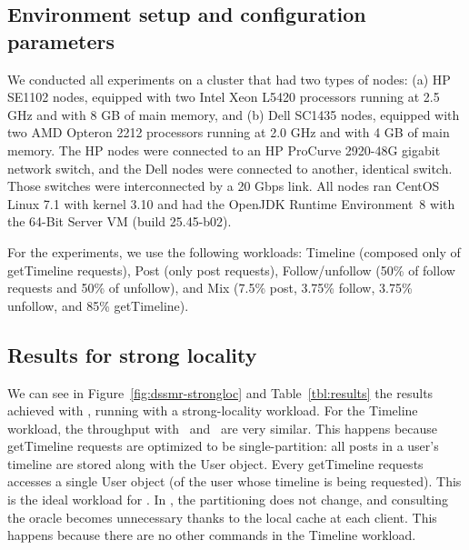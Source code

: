 \subsection{Environment setup and configuration parameters}
\label{sec:dssmr-evaluation:setup}

We conducted all experiments on a cluster that had two types of nodes: (a) HP
SE1102 nodes, equipped with two Intel Xeon L5420 processors running at 2.5 GHz
and with 8 GB of main memory, and (b) Dell SC1435 nodes, equipped with two AMD
Opteron 2212 processors running at 2.0 GHz and with 4 GB of main memory. The HP
nodes were connected to an HP ProCurve 2920-48G gigabit network switch, and the
Dell nodes were connected to another, identical switch. Those switches were
interconnected by a 20 Gbps link. All nodes ran CentOS Linux 7.1 with kernel
3.10 and had the OpenJDK Runtime Environment~8 with the \mbox{64-Bit} Server VM
(build 25.45-b02).

For the experiments, we use the following workloads: Timeline (composed only of
getTimeline requests), Post (only post requests), Follow/unfollow (50\% of
follow requests and 50\% of unfollow), and Mix (7.5\% post, 3.75\% follow,
3.75\% unfollow, and 85\% getTimeline).

\subsection{Results for strong locality}
\label{sec:dssmr-evaluation:strongloc}


We can see in Figure~\ref{fig:dssmr-strongloc} and Table~\ref{tbl:results} the
results achieved with \dssmrappname{}, running with a strong-locality workload.
For the Timeline workload, the throughput with \dssmr\ and \ssmr\ are very
similar. This happens because getTimeline requests are optimized to be
single-partition: all posts in a user's timeline are stored along with the User
object. Every getTimeline requests accesses a single User object (of the user
whose timeline is being requested). This is the ideal workload for \ssmr{}. In
\dssmr{}, the partitioning does not change, and consulting the oracle becomes
unnecessary thanks to the local cache at each client. This happens because there
are no other commands in the Timeline workload.

